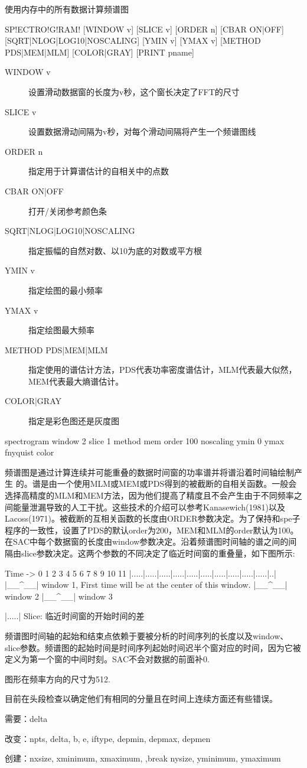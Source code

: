\label{cmd:spectrogram}

使用内存中的所有数据计算频谱图

\begin{SACSTX}
SP!ECTRO!G!RAM! [WINDOW v] [SLICE v] [ORDER n] [CBAR ON|OFF] 
    [SQRT|NLOG|LOG10|NOSCALING]
    [YMIN v] [YMAX v] [METHOD PDS|MEM|MLM] [COLOR|GRAY] 
    [PRINT pname]
\end{SACSTX}

\begin{description}
\item [WINDOW v] 设置滑动数据窗的长度为v秒，这个窗长决定了FFT的尺寸 
\item [SLICE v] 设置数据滑动间隔为v秒，对每个滑动间隔将产生一个频谱图线 
\item [ORDER n] 指定用于计算谱估计的自相关中的点数 
\item [CBAR ON|OFF] 打开/关闭参考颜色条 
\item [SQRT|NLOG|LOG10|NOSCALING] 指定振幅的自然对数、以10为底的对数或平方根
\item [YMIN v] 指定绘图的最小频率  
\item [YMAX v] 指定绘图最大频率 
\item [METHOD PDS|MEM|MLM] 指定使用的谱估计方法，PDS代表功率密度谱估计，MLM代表最大似然，MEM代表最大熵谱估计。  
\item [COLOR|GRAY] 指定是彩色图还是灰度图 
\end{description}

\begin{SACDFT}
spectrogram window 2 slice 1 method mem order 100 noscaling
    ymin 0 ymax fnyquist color
\end{SACDFT}

频谱图是通过计算连续并可能重叠的数据时间窗的功率谱并将谱沿着时间轴绘制产生	的。谱是由一个使用MLM或MEM或PDS得到的被截断的自相关函数。一般会选择高精度的MLM和MEM方法，因为他们提高了精度且不会产生由于不同频率之间能量泄漏导致的人工干扰。这些技术的介绍可以参考Kanasewich(1981)以及Lacoss(1971)。被截断的互相关函数的长度由ORDER参数决定。为了保持和spe子程序的一致性，设置了PDS的默认order为200，MEM和MLM的order默认为100。在SAC中每个数据窗的长度由window参数决定。沿着频谱图时间轴的谱之间的间隔由slice参数决定。这两个参数的不同决定了临近时间窗的重叠量，如下图所示:
\begin{SACCode}
Time ->
0  1  2  3  4  5  6  7  8  9 10 11
|.....|.....|.....|.....|.....|.....|.....|.....|.....|.....|..|
|__^__| window 1, First time will be at the center of this window.
      |__^__| window 2
            |__^__| window 3

|.....| Slice: 临近时间窗的开始时间的差
\end{SACCode}
频谱图时间轴的起始和结束点依赖于要被分析的时间序列的长度以及window、slice参数。频谱图的起始时间是时间序列起始时间迟半个窗对应的时间，因为它被定义为第一个窗的中间时刻。SAC不会对数据的前面补0.

图形在频率方向的尺寸为512.

目前在头段检查以确定他们有相同的分量且在时间上连续方面还有些错误。

需要：delta

改变：npts, delta, b, e, iftype, depmin, depmax, depmen

创建：nxsize, xminimum, xmaximum, ,break nysize, yminimum, ymaximum
